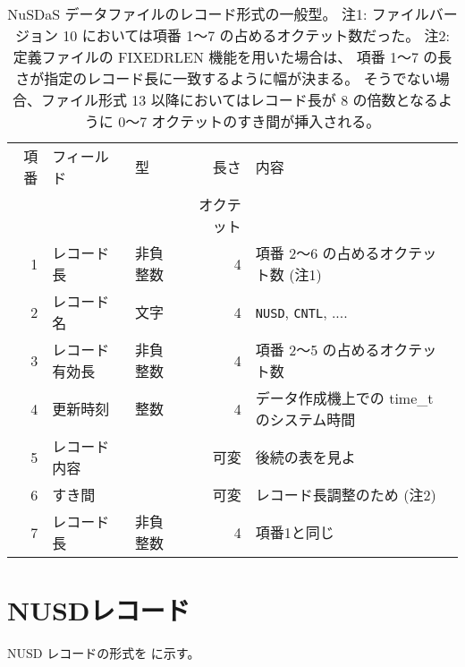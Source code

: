 \newpage

\begin{table}[htp]
 \begin{center}
 \begin{tabular}{r|llrl}
 \hline
 項番 & フィールド & 型 & 長さ & 内容 \\
      &            &    & オクテット &  \\
 \hline
 1 & レコード長 & 非負整数 & 4 & 項番 2〜6 の占めるオクテット数 (注1) \\
 2 & レコード名 & 文字 & 4 & {\tt NUSD}, {\tt CNTL}, .... \\
 3 & レコード有効長 & 非負整数 & 4 & 項番 2〜5 の占めるオクテット数 \\
 4 & 更新時刻 & 整数 & 4 & データ作成機上での time\_t のシステム時間 \\
 \hline
 5 & レコード内容 & & 可変 & 後続の表を見よ \\
 \hline
 6 & すき間 & & 可変 & レコード長調整のため (注2) \\
 7 & レコード長 & 非負整数 & 4 & 項番1と同じ \\
 \hline
 \end{tabular}
 \end{center}
 \caption[NuSDaS データファイルのレコード形式の一般型]{%
 NuSDaS データファイルのレコード形式の一般型。
 注1: ファイルバージョン 10 においては項番 1〜7 の占めるオクテット数だった。
 注2: 定義ファイルの FIXEDRLEN 機能を用いた場合は、
 項番 1〜7 の長さが指定のレコード長に一致するように幅が決まる。
 そうでない場合、ファイル形式 13 以降においてはレコード長が 8 の倍数となるように
 0〜7 オクテットのすき間が挿入される。
 }
 \label{table.fmt.general}
\end{table}


\newpage
\section{NUSDレコード}
\label{sec:fmt.nusd}

NUSD レコードの形式を  に示す。

